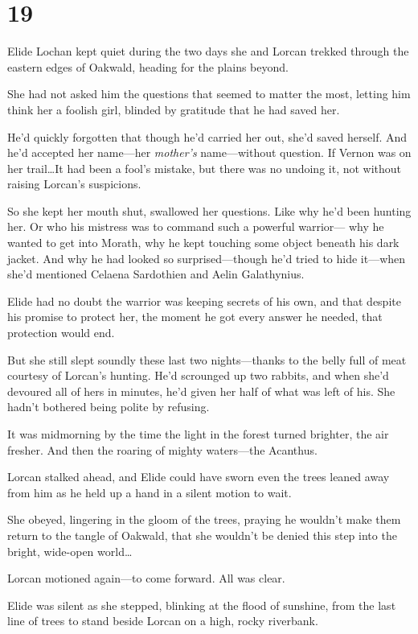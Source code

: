 
\chapter{19}

Elide Lochan kept quiet during the two days she and Lorcan trekked through the eastern edges of Oakwald, heading for the plains beyond.

She had not asked him the questions that seemed to matter the most, letting him think her a foolish girl, blinded by gratitude that he had saved her.

He'd quickly forgotten that though he'd carried her out, she'd saved herself.
And he'd accepted her name---her \emph{mother's} name---without question.
If Vernon was on her trail\ldots It had been a fool's mistake, but there was no undoing it, not without raising Lorcan's suspicions.

So she kept her mouth shut, swallowed her questions.
Like why he'd been hunting her.
Or who his mistress was to command such a powerful warrior--- why he wanted to get into Morath, why he kept touching some object beneath his dark jacket.
And why he had looked so surprised---though he'd tried to hide it---when she'd mentioned Celaena Sardothien and Aelin Galathynius.

Elide had no doubt the warrior was keeping secrets of his own, and that despite his promise to protect her, the moment he got every answer he needed, that protection would end.

But she still slept soundly these last two nights---thanks to the belly full of meat courtesy of Lorcan's hunting.
He'd scrounged up two rabbits, and when she'd devoured all of hers in minutes, he'd given her half of what was left of his.
She hadn't bothered being polite by refusing.

It was midmorning by the time the light in the forest turned brighter, the air fresher.
And then the roaring of mighty waters---the Acanthus.

Lorcan stalked ahead, and Elide could have sworn even the trees leaned away from him as he held up a hand in a silent motion to wait.

She obeyed, lingering in the gloom of the trees, praying he wouldn't make them return to the tangle of Oakwald, that she wouldn't be denied this step into the bright, wide-open world\ldots{}

Lorcan motioned again---to come forward.
All was clear.

Elide was silent as she stepped, blinking at the flood of sunshine, from the last line of trees to stand beside Lorcan on a high, rocky riverbank.

